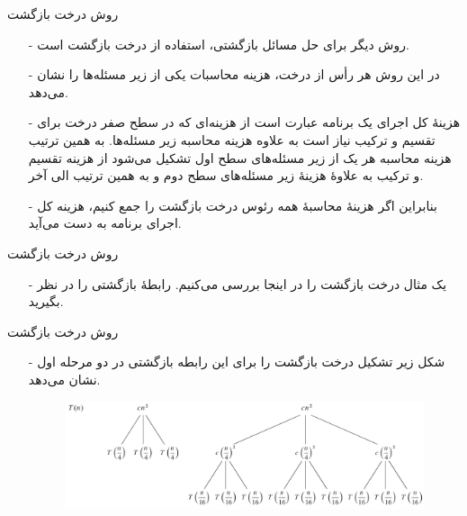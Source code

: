 
\begin{frame}{‌روش درخت بازگشت}
\begin{itemize}\itemr
\item[-]
روش دیگر برای حل مسائل بازگشتی، استفاده از درخت بازگشت
است.
\item[-]
در این روش هر رأس از درخت، هزینه محاسبات یکی از زیر مسئله‌ها را نشان می‌دهد.
\item[-]
هزینهٔ کل اجرای یک برنامه عبارت است از هزینه‌ای که در سطح صفر درخت برای تقسیم و ترکیب نیاز است به علاوه هزینه محاسبه زیر مسئله‌ها. به همین ترتیب هزینه محاسبه هر یک از زیر مسئله‌های سطح اول تشکیل می‌شود از هزینه تقسیم و ترکیب به علاوهٔ هزینهٔ زیر مسئله‌های سطح دوم و به همین ترتیب الی آخر.
\item[-]
بنابراین اگر هزینهٔ محاسبهٔ همه رئوس درخت بازگشت را جمع کنیم، هزینه کل اجرای برنامه به دست می‌آید.
\end{itemize}
\end{frame}


\begin{frame}{‌روش درخت بازگشت}
\begin{itemize}\itemr
\item[-]
یک مثال درخت بازگشت را در اینجا بررسی می‌کنیم. رابطهٔ بازگشتی
را در نظر بگیرید.
\end{itemize}
\end{frame}


\begin{frame}{‌روش درخت بازگشت}
\begin{itemize}\itemr
\item[-]
شکل زیر تشکیل درخت بازگشت را برای این رابطه بازگشتی در دو مرحله اول نشان می‌دهد.
\begin{figure}
\includegraphics[width=1\textwidth]{figs/chap03/tree96-1}
\end{figure}
\end{itemize}
\end{frame}


